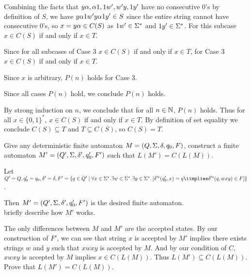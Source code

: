 \documentclass[11pt, sakura, night, 1in]{LatexTemplate/hw}
\begin{document}
{{{\begin{proofcases}
{{                        Combining the facts that $y\alpha, \alpha1, 1w', w'y, 1y'$ have no consecutive 0's by definition of $S$, we have $y\alpha 1w'y\alpha 1 y'\in S$ since the entire string cannot have consecutive 0's, so $x=y\alpha\in C(S)$ as $1w'\in\Sigma^*$ and $1y'\in\Sigma^*$.
                    }
                    For this subcase $x\in C(S)$ if and only if $x\in T$.

                    Since for all subcases of Case 3 $x\in C(S)$ if and only if $x\in T$, for Case 3 $x\in C(S)$ if and only if $x\in T$.
                }
                
                Since $x$ is arbitrary, $P(n)$ holds for Case 3.

                
            \end{proofcases}

            Since all cases $P(n)$ hold, we conclude $P(n)$ holds.
        }
    }

    By strong induction on $n$, we conclude that for all $n\in\mathbb{N}$, $P(n)$ holds. Thus for all $x\in\{0,1\}^*$, $x\in C(S)$ if and only if $x\in T$. By definition of set equality we conclude $C(S)\subseteq T$ and $T\subseteq C(S)$, so $C(S)=T$.
}

 Give any deterministic finite automaton $M=(Q,\Sigma,\delta,q_0,F)$, construct a finite automaton $M'=(Q',\Sigma,\delta',q_0',F')$ such that $L(M')=C(L(M))$.

Let $Q'=Q, q_0'=q_0, \de'=\de, F'=\{ q\in Q'\mid \forall x\in\Si^*.\exists w\in\Si^*.\exists y\in\Si^*. \sqrbra{\de'^*(q_0',x)=q\iimplies \de'^*(q,wxy)\in F}\}$. 



Then $M'=(Q',\Sigma,\delta',q_0',F')$ is the desired finite automaton.\\

 briefly describe how $M'$ works.

The only differences between $M$ and $M'$ are the accepted states. By our construction of $F'$, we can see that string $x$ is accepted by $M'$ implies there exists strings $w$ and $y$ such that $xwxy$ is accepted by $M$. And by our condition of $C$, $xwxy$ is accepted by $M$ implies $x\in C(L(M))$. Thus $L(M')\subseteq C(L(M))$.\\

 Prove that $L(M')=C(L(M))$.
\end{document}
